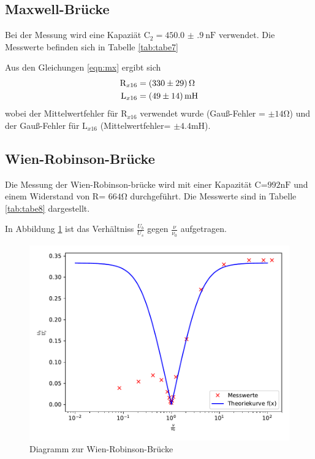 \subsection{Maxwell-Brücke}

Bei der Messung wird eine Kapaziät $ \text{C}_{2} = \SI{450.0(9)}{\nano\farad} $
verwendet. Die Messwerte befinden sich in Tabelle \ref{tab:tabe7}

Aus den Gleichungen \ref{eqn:mx}
ergibt sich\begin{align*}
  \text{R}_{x16} &= \SI{330 (29)}{\ohm} \\
  \text{L}_{x16} &= \SI{49 (14)}{\milli\henry}
\end{align*}
wobei der Mittelwertfehler für $ \text{R}_{x16} $ verwendet wurde (Gauß-Fehler =
$ \pm 14 \si{\ohm} $) und der Gauß-Fehler für $ \text{L}_{x16} $ (Mittelwertfehler=
$ \pm 4.4 \si{\milli\henry} $).

\subsection{Wien-Robinson-Brücke}
Die Messung der Wien-Robinson-brücke wird mit einer Kapazität C=$ 992\si{\nano\farad}$
und einem Widerstand von R= $664\si{\ohm}$ durchgeführt. Die Messwerte sind in Tabelle
\ref{tab:tabe8} dargestellt.



\noindent In Abbildung \ref{fig:plot} ist das Verhältniss $\frac{U_b}{U_s}$ gegen
$\frac{\nu}{\nu_0} $ aufgetragen.

\begin{figure}[H]
  \centering
  \includegraphics{plot.pdf}
  \caption{Diagramm zur Wien-Robinson-Brücke}
  \label{fig:plot}
\end{figure}

